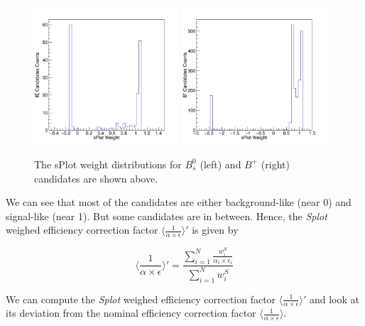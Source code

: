 \begin{figure}[h]
\begin{center}
\includegraphics[width= 0.48\textwidth]{Figures/Chapter5/Bs_sPLOTEffDistribution.png}
\includegraphics[width= 0.48\textwidth]{Figures/Chapter5/BP_sPLOTEffDistribution.png}
\caption{The sPlot weight distributions for $B_s^0$ (left) and $B^+$ (right) candidates are shown above.}
\label{BsBPSPlot}
\end{center}
\end{figure}

We can see that most of the candidates are either background-like (near 0) and signal-like (near 1). But some candidates are in between. Hence, the \textit{Splot} weighed efficiency correction factor $\langle\frac{1}{\alpha \times \epsilon} \rangle'$ is given by

\begin{equation}
\langle\frac{1}{\alpha \times \epsilon} \rangle' = \frac{\sum_{i = 1}^{N} \frac{w^S_i}{\alpha_i \times \epsilon_i}}{\sum_{i = 1}^{N}  w^S_i}
\end{equation}

We can compute the \textit{Splot} weighed efficiency correction factor $\langle\frac{1}{\alpha \times \epsilon} \rangle'$ and look at its deviation from the nominal efficiency correction factor $\langle\frac{1}{\alpha \times \epsilon} \rangle$. 


